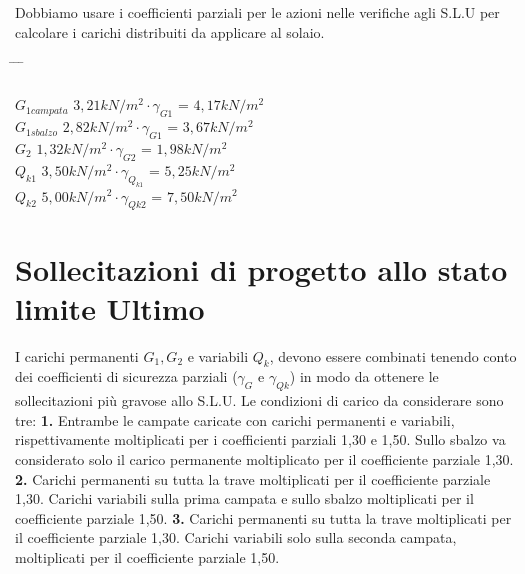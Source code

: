 \documentclass[a4paper,12pt, oneside]{book}
\begin{document}
    Dobbiamo usare i coefficienti parziali per le azioni nelle verifiche agli S.L.U per calcolare i carichi distribuiti da applicare al solaio.
    
    \begin{tabbing}
    	\phantom{Campata} \hspace{1em} \= \hspace{10em} \= \hspace{2em} \= \hspace{1em}\\\\
    	$G_{1campata}$    \> $3,21kN/m^2\cdot\gamma_{G1}$ \> = \> $4,17kN/m^2$ \\
    	$G_{1sbalzo}$     \> $2,82kN/m^2\cdot\gamma_{G1}$ \> = \> $3,67kN/m^2$ \\
    	$G_2$    \> $1,32kN/m^2\cdot\gamma_{G2}$ \> = \> $1,98kN/m^2$ \\ 
    	$Q_{k1}$ \> $3,50kN/m^2\cdot\gamma_{Q_{k1}}$ \> = \> $5,25kN/m^2$ \\       
    	$Q_{k2}$ \> $5,00kN/m^2\cdot\gamma_{Q{k2}}$ \> = \> $7,50kN/m^2$                    
    \end{tabbing}	
    
    \chapter{Sollecitazioni di progetto allo stato limite Ultimo}
    
    I carichi permanenti $G_1, G_2$ e variabili $Q_k$, devono essere combinati tenendo conto dei coefficienti di sicurezza parziali ($\gamma_{G}$ e $\gamma_{Qk}$) in modo da ottenere le sollecitazioni più gravose allo S.L.U. Le condizioni di carico da considerare sono tre:
    \leavevmode\newline
    \leavevmode\newline
    \phantom{12}\textbf{1.} Entrambe le campate caricate con carichi permanenti e variabili, rispettivamente moltiplicati per i coefficienti parziali 1,30 e 1,50. Sullo sbalzo va considerato solo il carico permanente moltiplicato per il coefficiente parziale 1,30.
    \leavevmode\newline
    \phantom{12}\textbf{2.} Carichi permanenti su tutta la trave moltiplicati per il coefficiente parziale 1,30. Carichi variabili sulla prima campata e sullo sbalzo moltiplicati per il coefficiente parziale 1,50. 
    \leavevmode\newline
    \phantom{12}\textbf{3.} Carichi permanenti su tutta la trave moltiplicati per il coefficiente parziale 1,30. Carichi variabili solo sulla seconda campata, moltiplicati per il coefficiente parziale 1,50.
    
\end{document}
